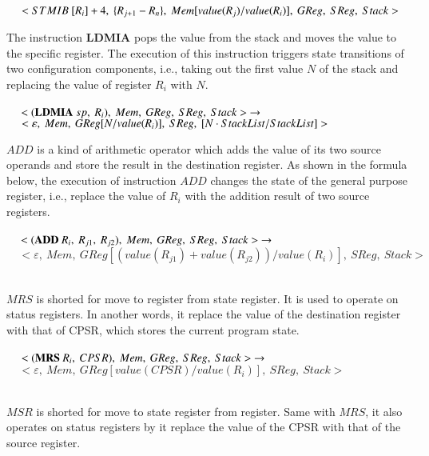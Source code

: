 \documentclass[conference]{IEEEtran}
\begin{document}
$~~~~~<STMIB~[R_i]+4,~\{R_{j+1}-R_n\},~Mem[value(R_j)/value(R_i)],~GReg,~SReg,~Stack>\\ \\$
\par The instruction \textbf{LDMIA} pops the value from the stack and moves the value to the specific register. The execution of this instruction triggers state transitions of two configuration components, i.e., taking out the first value $N$ of the stack and replacing the value of register $R_i$ with $N$.  \\ \\
$~~~~~<(\textbf{LDMIA} ~sp,~R_i),~Mem,~GReg,~SReg,~Stack>~\rightarrow\\ \\$
$~~~~~<\varepsilon,~Mem,~GReg[N/value(R_i)],~SReg,~[N\cdot StackList/StackList]>\\ \\$
\par $ADD$ is a kind of arithmetic operator which adds the value of its two source operands and store the result in the destination register. As shown in the formula below, the execution of instruction $ADD$ changes the state of the general purpose register, i.e., replace the value of $R_i$ with the addition result of two source registers.\\ \\
$~~~~~<(\textbf{ADD}~R_i,~R_{j1},~R_{j2}),~Mem,~GReg,~SReg,~Stack>~\rightarrow\\ \\$
$~~~~~<\varepsilon,~Mem,~GReg[(value(R_{j1})+value(R_{j2}))/value(R_i)],~SReg,~Stack>$\\ \\
\par $MRS$ is shorted for move to register from state register. It is used to operate on status registers. In another words, it replace the value of the destination register with that of CPSR, which stores the current program state. \\ \\
$~~~~~<(\textbf{MRS}~R_i,~CPSR),~Mem,~GReg,~SReg,~Stack>~\rightarrow\\ \\$
$~~~~~<\varepsilon,~Mem,~GReg[value(CPSR)/value(R_i)],~SReg,~Stack>$\\ \\
\par $MSR$ is shorted for move to state register from register. Same with $MRS$, it also operates on status registers by it replace the value of the CPSR with that of the source register.\\ \\
\end{document}
